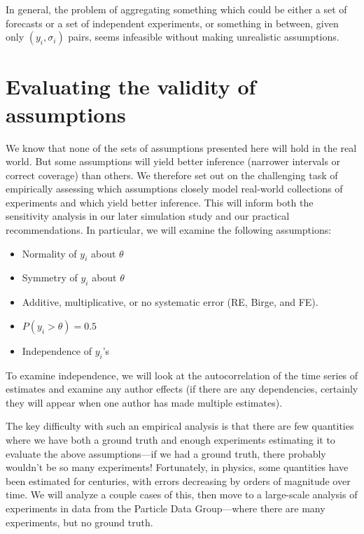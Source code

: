 \documentclass[12pt]{article}
\begin{document}
In general, the problem of aggregating something which could be either a set of forecasts or a set of independent experiments, or something in between, given only $(y_i,\sigma_i)$ pairs, seems infeasible without making unrealistic assumptions.

\section{Evaluating the validity of assumptions}\label{evaluating-the-validity-of-assumptions}

We know that none of the sets of assumptions presented here will hold in the real world. But some assumptions will yield better inference (narrower intervals or correct coverage) than others. We therefore set out on the challenging task of empirically assessing which assumptions closely model real-world collections of experiments and which yield better inference. This will inform both the sensitivity analysis in our later simulation study and our practical recommendations. In particular, we will examine the following assumptions:

\begin{itemize}

\item
  Normality of $y_i$ about $\theta$
\item
  Symmetry of $y_i$ about $\theta$
\item
  Additive, multiplicative, or no systematic error (RE, Birge, and FE).
\item
  $P(y_i>\theta)=0.5$
\item
  Independence of $y_i$'s
\end{itemize}

To examine independence, we will look at the autocorrelation of the time series of estimates and examine any author effects (if there are any dependencies, certainly they will appear when one author has made multiple estimates).

The key difficulty with such an empirical analysis is that there are few quantities where we have both a ground truth and enough experiments estimating it to evaluate the above assumptions---if we had a ground truth, there probably wouldn't be so many experiments! Fortunately, in physics, some quantities have been estimated for centuries, with errors decreasing by orders of magnitude over time. We will analyze a couple cases of this, then move to a large-scale analysis of experiments in data from the Particle Data Group---where there are many experiments, but no ground truth.
\end{document}
